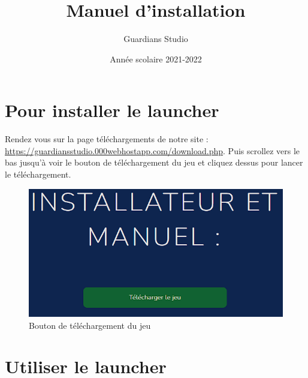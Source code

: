 \documentclass[a4paper, 10pt]{article}
\title{\textbf{Manuel d'installation}}
\author{Guardians Studio}
\date{Année scolaire 2021-2022}
\begin{document}
	\maketitle
	\tableofcontents
	\section{Pour installer le launcher}
	Rendez vous sur la page téléchargements de notre site :
	\url{https://guardiansstudio.000webhostapp.com/download.php}.
	Puis scrollez vers le bas jusqu'à voir le bouton de téléchargement du jeu et cliquez dessus pour lancer le téléchargement.
	
	\begin{figure}[ht]
		\centering
		\includegraphics[scale=0.6]{images/download_launcher.png}
		\caption{Bouton de téléchargement du jeu}
	\end{figure}

	\section{Utiliser le launcher}
	
\end{document}
